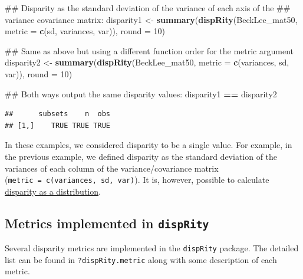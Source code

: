 \documentclass[]{book}
\newenvironment{Shaded}{\begin{snugshade}}{\end{snugshade}}
\newcommand{\KeywordTok}[1]{\textcolor[rgb]{0.13,0.29,0.53}{\textbf{#1}}}
\newcommand{\DataTypeTok}[1]{\textcolor[rgb]{0.13,0.29,0.53}{#1}}
\newcommand{\DecValTok}[1]{\textcolor[rgb]{0.00,0.00,0.81}{#1}}
\newcommand{\StringTok}[1]{\textcolor[rgb]{0.31,0.60,0.02}{#1}}
\newcommand{\OperatorTok}[1]{\textcolor[rgb]{0.81,0.36,0.00}{\textbf{#1}}}
\newcommand{\NormalTok}[1]{#1}
\theoremstyle{definition}
\theoremstyle{definition}
\theoremstyle{remark}
\begin{document}
\begin{Shaded}
\begin{Highlighting}[]
\NormalTok{## Disparity as the standard deviation of the variance of each axis of the}
\NormalTok{## variance covariance matrix:}
\NormalTok{disparity1 <-}\StringTok{ }\KeywordTok{summary}\NormalTok{(}\KeywordTok{dispRity}\NormalTok{(BeckLee_mat50, }\DataTypeTok{metric =} \KeywordTok{c}\NormalTok{(sd, variances, var)),}
                      \DataTypeTok{round =} \DecValTok{10}\NormalTok{)}

\NormalTok{## Same as above but using a different function order for the metric argument}
\NormalTok{disparity2 <-}\StringTok{ }\KeywordTok{summary}\NormalTok{(}\KeywordTok{dispRity}\NormalTok{(BeckLee_mat50, }\DataTypeTok{metric =} \KeywordTok{c}\NormalTok{(variances, sd, var)),}
                      \DataTypeTok{round =} \DecValTok{10}\NormalTok{)}

\NormalTok{## Both ways output the same disparity values:}
\NormalTok{disparity1 }\OperatorTok{==}\StringTok{ }\NormalTok{disparity2}
\end{Highlighting}
\end{Shaded}

\begin{verbatim}
##      subsets    n  obs
## [1,]    TRUE TRUE TRUE
\end{verbatim}

In these examples, we considered disparity to be a single value. For
example, in the previous example, we defined disparity as the standard
deviation of the variances of each column of the variance/covariance
matrix (\texttt{metric\ =\ c(variances,\ sd,\ var)}). It is, however,
possible to calculate
\protect\hyperlink{disparity-as-a-distribution}{disparity as a
distribution}.

\subsection{\texorpdfstring{Metrics implemented in
\texttt{dispRity}}{Metrics implemented in dispRity}}\label{metrics-implemented-in-disprity}

Several disparity metrics are implemented in the \texttt{dispRity}
package. The detailed list can be found in \texttt{?dispRity.metric}
along with some description of each metric.
\end{document}
